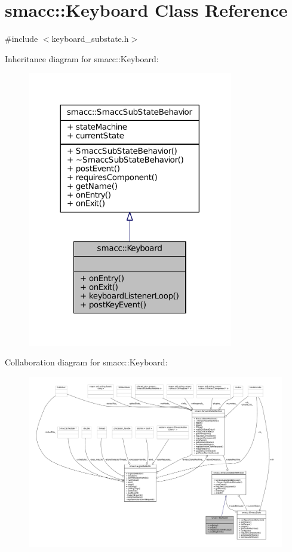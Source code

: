 \hypertarget{classsmacc_1_1Keyboard}{}\section{smacc\+:\+:Keyboard Class Reference}
\label{classsmacc_1_1Keyboard}


{\ttfamily \#include $<$keyboard\+\_\+substate.\+h$>$}



Inheritance diagram for smacc\+:\+:Keyboard\+:
\nopagebreak
\begin{figure}[H]
\begin{center}
\leavevmode
\includegraphics[width=254pt]{classsmacc_1_1Keyboard__inherit__graph}
\end{center}
\end{figure}


Collaboration diagram for smacc\+:\+:Keyboard\+:
\nopagebreak
\begin{figure}[H]
\begin{center}
\leavevmode
\includegraphics[width=350pt]{classsmacc_1_1Keyboard__coll__graph}
\end{center}
\end{figure}
